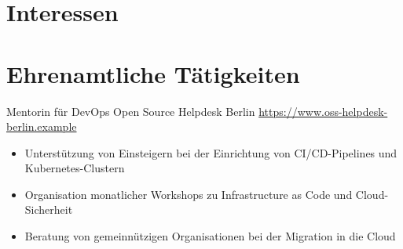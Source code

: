 \documentclass[a4paper, serif, 10pt]{moderncv}
\begin{document}
\section{Interessen}

\section{Ehrenamtliche Tätigkeiten}

        {Mentorin für DevOps}
        {Open Source Helpdesk Berlin}
        {\url{https://www.oss-helpdesk-berlin.example}}
        {}
        {\begin{itemize}
\item Unterstützung von Einsteigern bei der Einrichtung von CI/CD-Pipelines und Kubernetes-Clustern
\item Organisation monatlicher Workshops zu Infrastructure as Code und Cloud-Sicherheit
\item Beratung von gemeinnützigen Organisationen bei der Migration in die Cloud
\end{itemize}}
    
\end{document}
